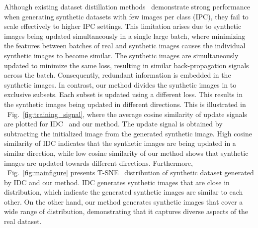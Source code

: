 \documentclass{article}
\theoremstyle{plain}
\theoremstyle{definition}
\theoremstyle{remark}
\begin{document}
Although existing dataset distillation methods~\cite{} demonstrate strong performance when generating synthetic datasets with few images per class (IPC), they fail to scale effectively to higher IPC settings. This limitation arises due to synthetic images being updated simultaneously in a single large batch, where minimizing the features between batches of real and synthetic images causes the individual synthetic images to become similar. The synthetic images are simultaneously updated to minimize the same loss, resulting in similar back-propagation signals across the batch. Consequently, redundant information is embedded in the synthetic images. In contrast, our method divides the synthetic images in to exclusive subsets. Each subset is updated using a different loss. This results in the synthetic images being updated in different directions. This is illustrated in ~Fig.~\ref{fig:training_signal}, where the average cosine similarity of update signals are plotted for IDC~\cite{} and our method. The update signal is obtained by subtracting the initialized image from the generated synthetic image. High cosine similarity of IDC indicates that the synthetic images are being updated in a similar direction, while low cosine similarity of our method shows that synthetic images are updated towards different directions. Furthermore, ~Fig.~\ref{fig:mainfigure} presents T-SNE~\cite{} distribution of synthetic dataset generated by IDC and our method. IDC generates synthetic images that are close in distribution, which indicate the generated synthetic images are similar to each other. On the other hand, our method generates synthetic images that cover a wide range of distribution, demonstrating that it captures diverse aspects of the real dataset.

\end{document}
